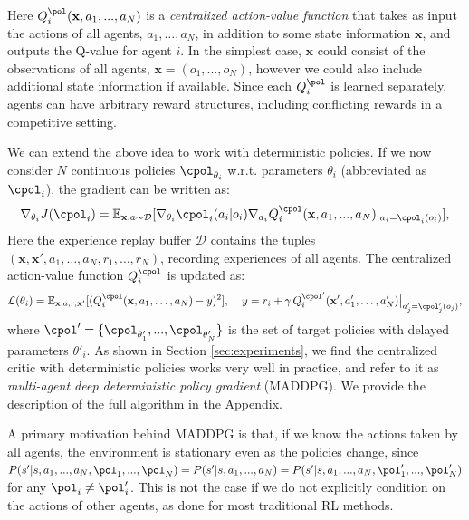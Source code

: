 Here $Q^{\pol}_i (\mathbf{x},a_1, ..., a_N)$ is a \textit{centralized action-value function} that takes as input the actions of all agents, $a_1,\ldots, a_N$, in addition to some state information $\mathbf{x}$, and outputs the Q-value for agent $i$. In the simplest case, $\mathbf{x}$ could consist of the observations of all agents, $\mathbf{x} = (o_1, ..., o_N)$, however we could also include additional state information if available. Since each $Q^{\pol}_i$ is learned separately, agents can have arbitrary reward structures, including conflicting rewards in a competitive setting.

We can extend the above idea to work with deterministic policies. If we now consider $N$ continuous policies $\cpol_{\theta_i}$ w.r.t. parameters $\theta_i$ (abbreviated as $\cpol_i$), the gradient can be written as:
\begin{equation}
\nabla_{\theta_i} J(\cpol_i) = \mathbb{E}_{\mathbf{x},a \sim \mathcal{D}}[\nabla_{\theta_i} \cpol_i(a_i|o_i) \nabla_{a_i} Q^{\cpol}_i (\mathbf{x},a_1, ..., a_N)|_{a_i=\cpol_i (o_i)}],
\end{equation}
Here the experience replay buffer $\mathcal{D}$ contains the tuples $(\mathbf{x},\mathbf{x}',a_1,\ldots,a_N,r_1,\ldots,r_N)$, recording experiences of all agents. 
The centralized action-value function $Q^{\cpol}_i$ is updated as:
\begin{equation}\label{eq:q_func}
\mathcal{L}(\theta_i) = \mathbb{E}_{\mathbf{x},a,r,\mathbf{x}'}[(Q^{\cpol}_i(\mathbf{x},a_1,\ldots,a_N) - y)^2], \;\;\;\;
y = r_i + \gamma\, Q^{\cpol'}_i(\mathbf{x}', a_1',\ldots,a_N')\big|_{a_j'=\cpol'_j(o_j)},
\end{equation}
where $\cpol' = \{\cpol_{\theta'_1}, ..., \cpol_{\theta'_N} \}$ is the set of target policies with delayed parameters $\theta'_i$. As shown in Section \ref{sec:experiments}, we find the centralized critic with deterministic policies works very well in practice, and refer to it as \textit{multi-agent deep deterministic policy gradient} (MADDPG). 
We provide the description of the full algorithm in the Appendix. 

A primary motivation behind MADDPG is that, if we know the actions taken by all agents, the environment is stationary even as the policies change, since $P(s'|s,a_1,...,a_N,\pol_1,...,\pol_N) = P(s'|s,a_1,...,a_N) = P(s'|s,a_1,...,a_N,\pol'_1,...,\pol'_N)$ for any $\pol_i \neq \pol_i'$. This is not the case if we do not explicitly condition on the actions of other agents, as done for most traditional RL methods. %

